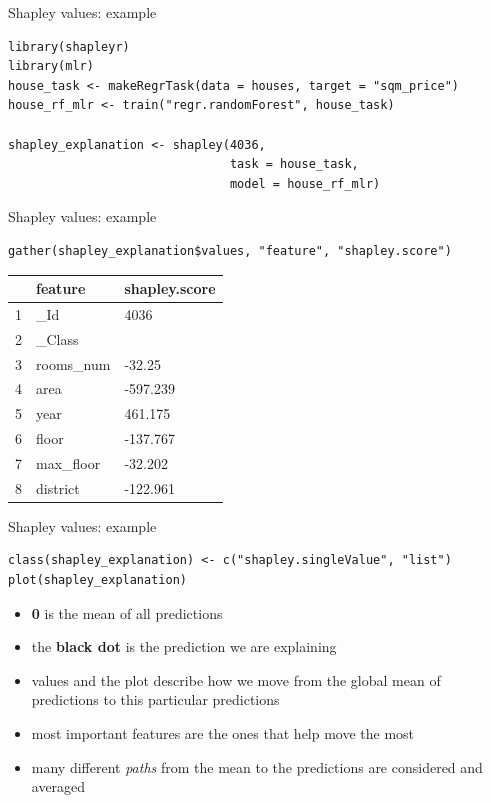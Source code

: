 \documentclass[xcolor={dvipsnames}]{beamer}
\begin{document}
\begin{frame}[fragile]{Shapley values: example}
	\begin{lstlisting}
library(shapleyr)
library(mlr)
house_task <- makeRegrTask(data = houses, target = "sqm_price")
house_rf_mlr <- train("regr.randomForest", house_task)	

shapley_explanation <- shapley(4036,
                               task = house_task,
                               model = house_rf_mlr)
	\end{lstlisting}
\end{frame}

\begin{frame}[fragile]{Shapley values: example}
\begin{lstlisting}
gather(shapley_explanation$values, "feature", "shapley.score")
\end{lstlisting}
\begin{table}[ht]
	\centering
	\begin{tabular}{rll}
		\hline
		& feature & shapley.score \\ 
		\hline
		1 & \_Id & 4036 \\ 
		2 & \_Class &  \\ 
		3 & rooms\_num & -32.25 \\ 
		4 & area & -597.239 \\ 
		5 & year & 461.175 \\ 
		6 & floor & -137.767 \\ 
		7 & max\_floor & -32.202 \\ 
		8 & district & -122.961 \\ 
		\hline
	\end{tabular}
\end{table}
\end{frame}

\begin{frame}[fragile]{Shapley values: example}
\begin{lstlisting}
class(shapley_explanation) <- c("shapley.singleValue", "list")
plot(shapley_explanation)
\end{lstlisting}
\begin{itemize}
	\item \textbf{0} is the mean of all predictions
	
	\item the \textbf{black dot} is the prediction we are explaining
	
	\item values and the plot describe how we move from the global mean of predictions to this particular predictions
	
	\item most important features are the ones that help move the most
	
	\item many different \textit{paths} from the mean to the predictions are considered and averaged
\end{itemize}
\end{frame}
\end{document}
